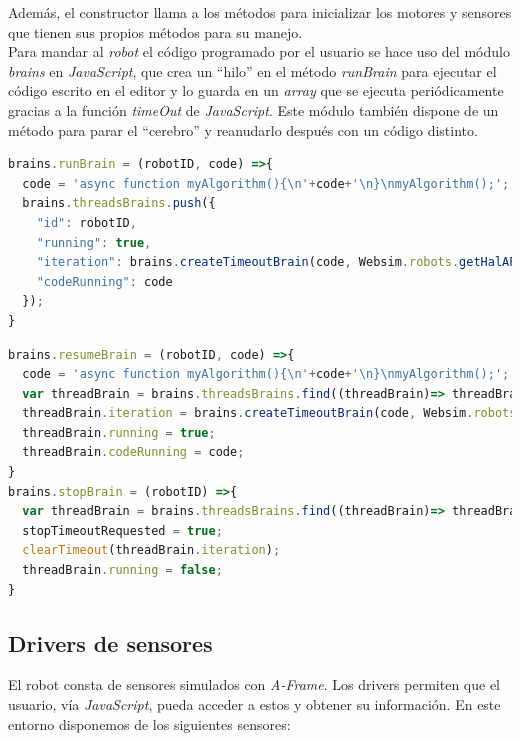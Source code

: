 Además, el constructor llama a los métodos para inicializar los motores y sensores que tienen sus propios métodos para su manejo. \\

Para mandar al \textit{robot} el código programado por el usuario se hace uso del módulo \textit{brains} en \textit{JavaScript}, que crea un ``hilo'' en el método \textit{runBrain} para ejecutar el código escrito en el editor y lo guarda en un \textit{array} que se ejecuta periódicamente gracias a la función \textit{timeOut} de \textit{JavaScript}. 
Este módulo también dispone de un método para parar el ``cerebro'' y reanudarlo después con un código distinto.
\begin{lstlisting}[language=javascript, caption=Método \textit{runBrain} para ejecutar el código del usuario]
brains.runBrain = (robotID, code) =>{
  code = 'async function myAlgorithm(){\n'+code+'\n}\nmyAlgorithm();';
  brains.threadsBrains.push({
    "id": robotID,
    "running": true,
    "iteration": brains.createTimeoutBrain(code, Websim.robots.getHalAPI(robotID), robotID),
    "codeRunning": code
  });
}
\end{lstlisting}

\begin{lstlisting}[language=javascript, caption=Métodos \textit{resumeBrain} y \textit{stopBrain} para parar/reanudar el cerebro del robot]
brains.resumeBrain = (robotID, code) =>{
  code = 'async function myAlgorithm(){\n'+code+'\n}\nmyAlgorithm();';
  var threadBrain = brains.threadsBrains.find((threadBrain)=> threadBrain.id == robotID);
  threadBrain.iteration = brains.createTimeoutBrain(code, Websim.robots.getHalAPI(robotID), robotID);
  threadBrain.running = true;
  threadBrain.codeRunning = code;
}
brains.stopBrain = (robotID) =>{
  var threadBrain = brains.threadsBrains.find((threadBrain)=> threadBrain.id == robotID);
  stopTimeoutRequested = true;
  clearTimeout(threadBrain.iteration);
  threadBrain.running = false;
}
\end{lstlisting}


\subsection{Drivers de sensores}
\label{subsec:driversSensores}
El robot consta de sensores simulados con \textit{A-Frame}. Los drivers permiten que el usuario, vía \textit{JavaScript}, pueda acceder a estos y obtener su información. En este entorno disponemos de los siguientes sensores: 

